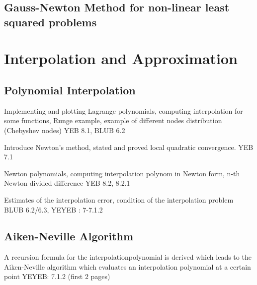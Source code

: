 \documentclass{article}
\theoremstyle{remark}
\begin{document}
\subsection{Gauss-Newton Method for non-linear least squared problems}%
\label{sub:gauss_newton_method_for_non_linear_least_squared_problems}

\newpage
\section{Interpolation and Approximation}%
\label{sec:interpolation_and_approximation}

\subsection{Polynomial Interpolation}%
\label{sub:polynomial_interpolation}

\begin{tcolorbox}
  Implementing and plotting Lagrange polynomials, computing interpolation for some functions, Runge example, example of different nodes distribution (Chebyshev nodes)	
  YEB 8.1, BLUB 6.2
\end{tcolorbox}

\begin{tcolorbox}
   Introduce Newton's method, stated and proved local quadratic convergence. 	
   YEB 7.1

\end{tcolorbox}

\begin{tcolorbox}
  Newton polynomials, computing interpolation polynom in Newton form, n-th Newton divided difference	
  YEB 8.2, 8.2.1
\end{tcolorbox}

\begin{tcolorbox}
  Estimates of the interpolation error, condition of the interpolation problem	
   BLUB 6.2/6.3, YEYEB : 7-7.1.2
\end{tcolorbox}

\subsection{Aiken-Neville Algorithm}%
\label{sub:aiken_neville_algorithm}


\begin{tcolorbox}
  A recursion formula for the interpolationpolynomial is derived  which leads to the Aiken-Neville algorithm which evaluates an interpolation polynomial at a certain point	
  YEYEB: 7.1.2 (first 2 pages)

\end{tcolorbox}
\end{document}
